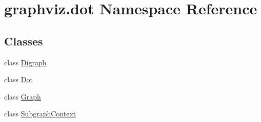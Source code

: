 \hypertarget{namespacegraphviz_1_1dot}{}\section{graphviz.\+dot Namespace Reference}
\label{namespacegraphviz_1_1dot}
\subsection*{Classes}
\begin{DoxyCompactItemize}
\item 
class \hyperlink{classgraphviz_1_1dot_1_1Digraph}{Digraph}
\item 
class \hyperlink{classgraphviz_1_1dot_1_1Dot}{Dot}
\item 
class \hyperlink{classgraphviz_1_1dot_1_1Graph}{Graph}
\item 
class \hyperlink{classgraphviz_1_1dot_1_1SubgraphContext}{Subgraph\+Context}
\end{DoxyCompactItemize}
